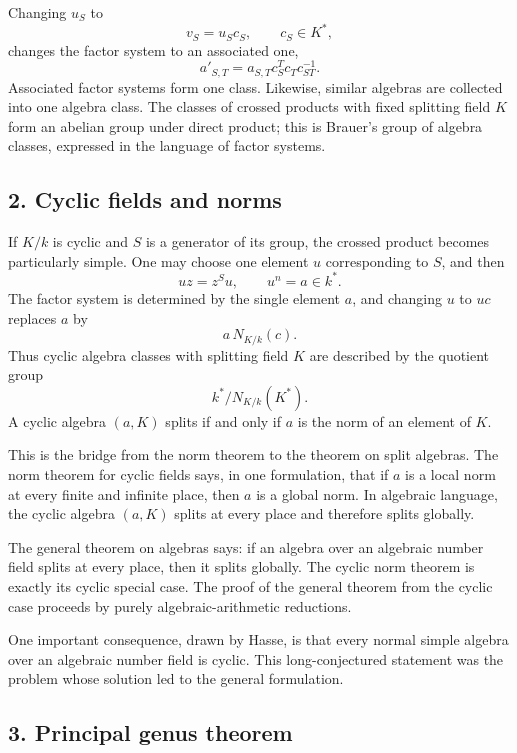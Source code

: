 \documentclass[11pt]{article}
\begin{document}
Changing \(u_S\) to \[
  v_S=u_Sc_S,
  \qquad c_S\in K^*,
\] changes the factor system to an associated one, \[
  a'_{S,T}=a_{S,T}c_S^T c_T c_{ST}^{-1}.
\] Associated factor systems form one class. Likewise, similar algebras
are collected into one algebra class. The classes of crossed products
with fixed splitting field \(K\) form an abelian group under direct
product; this is Brauer's group of algebra classes, expressed in the
language of factor systems.

\subsection{2. Cyclic fields and norms}\label{cyclic-fields-and-norms}

If \(K/k\) is cyclic and \(S\) is a generator of its group, the crossed
product becomes particularly simple. One may choose one element \(u\)
corresponding to \(S\), and then \[
  uz=z^S u,
  \qquad
  u^n=a\in k^*.
\] The factor system is determined by the single element \(a\), and
changing \(u\) to \(uc\) replaces \(a\) by \[
  a\,N_{K/k}(c).
\] Thus cyclic algebra classes with splitting field \(K\) are described
by the quotient group \[
  k^*/N_{K/k}(K^*).
\] A cyclic algebra \((a,K)\) splits if and only if \(a\) is the norm of
an element of \(K\).

This is the bridge from the norm theorem to the theorem on split
algebras. The norm theorem for cyclic fields says, in one formulation,
that if \(a\) is a local norm at every finite and infinite place, then
\(a\) is a global norm. In algebraic language, the cyclic algebra
\((a,K)\) splits at every place and therefore splits globally.

The general theorem on algebras says: if an algebra over an algebraic
number field splits at every place, then it splits globally. The cyclic
norm theorem is exactly its cyclic special case. The proof of the
general theorem from the cyclic case proceeds by purely
algebraic-arithmetic reductions.

One important consequence, drawn by Hasse, is that every normal simple
algebra over an algebraic number field is cyclic. This long-conjectured
statement was the problem whose solution led to the general formulation.

\subsection{3. Principal genus theorem}\label{principal-genus-theorem}
\end{document}
